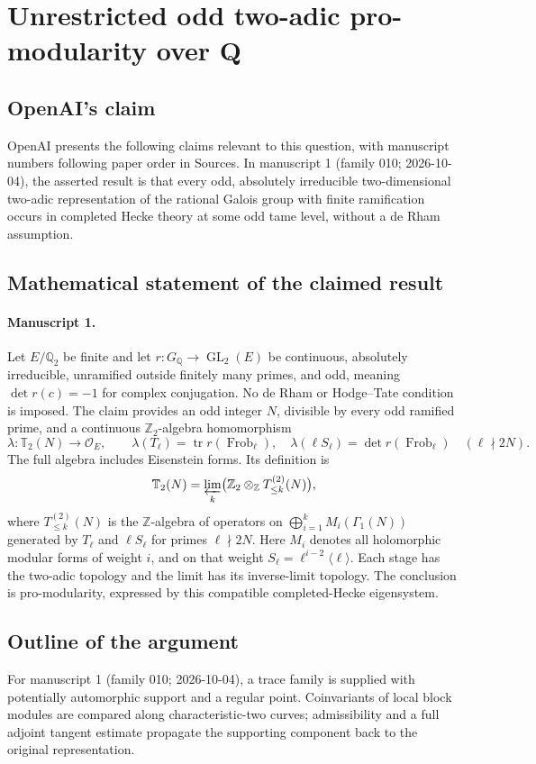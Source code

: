 \documentclass[11pt]{article}
\begin{document}
\section*{Unrestricted odd two-adic pro-modularity over Q}

\subsection{OpenAI's claim}
OpenAI presents the following claims relevant to this question, with manuscript numbers following paper order in Sources. In manuscript 1 (family 010; 2026-10-04), the asserted result is that every odd, absolutely irreducible two-dimensional two-adic representation of the rational Galois group with finite ramification occurs in completed Hecke theory at some odd tame level, without a de Rham assumption.

\subsection{Mathematical statement of the claimed result}
\paragraph{Manuscript 1.}
Let $E/\mathbb Q_2$ be finite and let $r:G_{\mathbb Q}\to\operatorname{GL}_2(E)$ be continuous, absolutely irreducible, unramified outside finitely many primes, and odd, meaning $\det r(c)=-1$ for complex conjugation. No de Rham or Hodge--Tate condition is imposed. The claim provides an odd integer $N$, divisible by every odd ramified prime, and a continuous $\mathbb Z_2$-algebra homomorphism
\[
 \lambda:\mathbb T_2(N)\longrightarrow\mathcal O_E,
 \qquad\lambda(T_{\ell})=\operatorname{tr}r(\operatorname{Frob}_{\ell}),\quad
 \lambda(\ell S_{\ell})=\det r(\operatorname{Frob}_{\ell})\quad(\ell\nmid2N).
\]
The full algebra includes Eisenstein forms. Its definition is
\[
 \mathbb T_2(N)=\varprojlim_k\bigl(\mathbb Z_2\otimes_{\mathbb Z}T_{\le k}^{(2)}(N)\bigr),
\]
where $T_{\le k}^{(2)}(N)$ is the $\mathbb Z$-algebra of operators on $\bigoplus_{i=1}^kM_i(\Gamma_1(N))$ generated by $T_\ell$ and $\ell S_\ell$ for primes $\ell\nmid2N$. Here $M_i$ denotes all holomorphic modular forms of weight $i$, and on that weight $S_\ell=\ell^{i-2}\langle\ell\rangle$. Each stage has the two-adic topology and the limit has its inverse-limit topology. The conclusion is pro-modularity, expressed by this compatible completed-Hecke eigensystem.

\subsection{Outline of the argument}
For manuscript 1 (family 010; 2026-10-04), a trace family is supplied with potentially automorphic support and a regular point. Coinvariants of local block modules are compared along characteristic-two curves; admissibility and a full adjoint tangent estimate propagate the supporting component back to the original representation.
\end{document}
